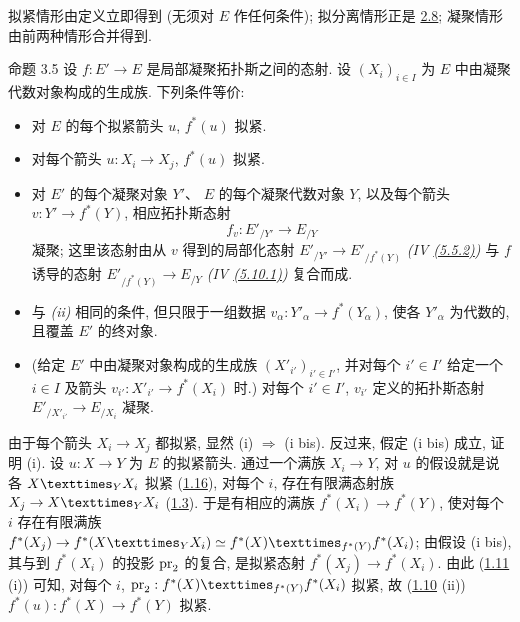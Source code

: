 拟紧情形由定义立即得到 (无须对 $E$ 作任何条件);
拟分离情形正是 \hyperref[VI.cor2.8]{2.8};
凝聚情形由前两种情形合并得到.

\begin{enonce*}{命题 3.5}
设 $f:E'\to E$ 是局部凝聚拓扑斯之间的态射.
设 $(X_i)_{i\in I}$ 为 $E$ 中由凝聚代数对象构成的生成族.
下列条件等价:
\begin{itemize}
\item[(i)] 对 $E$ 的每个拟紧箭头 $u$, $f^{\ast}(u)$ 拟紧.

\item[(i bis)] 对每个箭头 $u:X_i\to X_j$, $f^{\ast}(u)$ 拟紧.

\item[(ii)] 对 $E'$ 的每个凝聚对象 $Y'$、
$E$ 的每个凝聚代数对象 $Y$,
以及每个箭头 $v:Y'\to f^{\ast}(Y)$,
相应拓扑斯态射
$$
f_v:{E'}_{/Y'}\to E_{/Y}
$$
凝聚; 这里该态射由从 $v$ 得到的局部化态射\pageoriginale{}
${E'}_{/Y'}\to{E'}_{/f^{\ast}(Y)}$
\emph{(IV \hyperref[IV.eq5.5.2]{(5.5.2)})}
与 $f$ 诱导的态射
${E'}_{/f^{\ast}(Y)}\to E_{/Y}$
\emph{(IV \hyperref[IV.eq5.10.1]{(5.10.1)})} 复合而成.

\item[(ii bis)] 与 \emph{(ii)} 相同的条件,
但只限于一组数据 $v_{\alpha}:{Y'}_{\alpha}\to f^{\ast}(Y_{\alpha})$,
使各 ${Y'}_{\alpha}$ 为代数的, 且覆盖 $E'$ 的终对象.

\item[(ii ter)] (给定 $E'$ 中由凝聚对象构成的生成族
$(X'_{i'})_{i'\in I'}$,
并对每个 $i'\in I'$ 给定一个 $i\in I$
及箭头 $v_{i'}:X'_{i'}\to f^{\ast}(X_i)$ 时.)
对每个 $i'\in I'$,
$v_{i'}$ 定义的拓扑斯态射 $E'_{/{X'}_{i'}}\to E_{/X_i}$ 凝聚.
\end{itemize}
\end{enonce*}

由于每个箭头 $X_i\to X_j$ 都拟紧,
显然 (i) $\Rightarrow$ (i bis).
反过来, 假定 (i bis) 成立, 证明 (i).
设 $u:X\to Y$ 为 $E$ 的拟紧箭头.
通过一个满族 $X_i\to Y$,
对 $u$ 的假设就是说各 $\fprod{X}{X_i}{Y}$ 拟紧
(\hyperref[VI.cor1.16]{1.16}),
\ie 对每个 $i$, 存在有限满态射族
$X_j\to\fprod{X}{X_i}{Y}$ (\hyperref[VI.prop1.3]{1.3}).
于是有相应的满族 $f^{\ast}(X_i)\to f^{\ast}(Y)$,
使对每个 $i$ 存在有限满族
$f^{\ast}(X_j)\to f^{\ast}(\fprod{X}{X_i}{Y})\simeq
\fprod{f^{\ast}(X)}{f^{\ast}(X_i)}{f^{\ast}(Y)}$;
由假设 (i bis), 其与到 $f^{\ast}(X_i)$ 的投影 $\operatorname{pr}_2$ 的复合,
是拟紧态射 $f^{\ast}(X_j)\to f^{\ast}(X_i)$.
由此 (\hyperref[VI.cor1.11]{1.11} (i)) 可知,
对每个 $i$,
$\pr_2:\fprod{f^{\ast}(X)}{f^{\ast}(X_i)}{f^{\ast}(Y)}$ 拟紧,
故 (\hyperref[VI.prop1.10]{1.10} (ii))
$f^{\ast}(u):f^{\ast}(X)\to f^{\ast}(Y)$ 拟紧.

